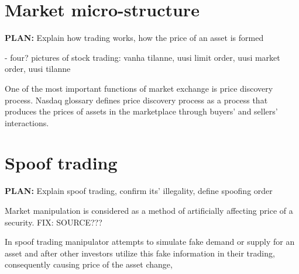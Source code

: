 \documentclass{tut-thesis}
\begin{document}

\section{Market micro-structure}
\textbf{PLAN:} Explain how trading works, how the price of an asset is formed


- four? pictures of stock trading: vanha tilanne, uusi limit order, uusi market order, uusi tilanne 


One of the most important functions of market exchange is price discovery process. Nasdaq glossary \autocite*{} defines price discovery process as a process that produces the prices of assets in the marketplace through buyers' and sellers' interactions.


\section{Spoof trading}
\textbf{PLAN:} Explain spoof trading, confirm its' illegality, define spoofing order

Market manipulation is considered as a method of artificially affecting price of a security. FIX: SOURCE???


\autocite{KyleViswanathan2008}

In spoof trading manipulator attempts to simulate fake demand or supply for an asset and after other investors utilize this fake information in their trading, consequently causing price of the asset change, 
\end{document}
